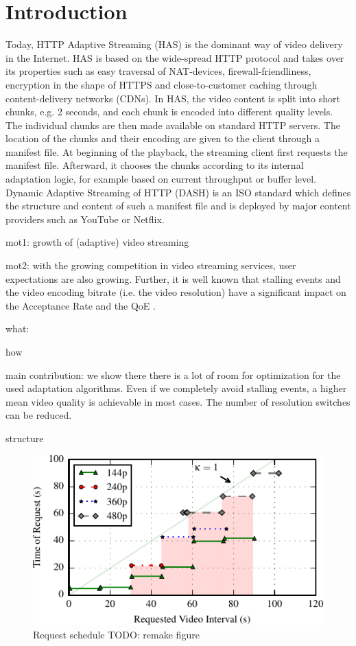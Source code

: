 
\section{Introduction}
\label{sec:introduction}

Today, HTTP Adaptive Streaming (HAS) is the dominant way of video delivery in the Internet. 
HAS is based on the wide-spread HTTP protocol and takes over its properties such as easy traversal of NAT-devices, firewall-friendliness, encryption in the shape of HTTPS and close-to-customer caching through content-delivery networks (CDNs).
In HAS, the video content is split into short chunks, e.g. 2 seconds, and each chunk is encoded into different quality levels.
The individual chunks are then made available on standard HTTP servers.
The location of the chunks and their encoding are given to the client through a manifest file.
At beginning of the playback, the streaming client first requests the manifest file. 
Afterward, it chooses the chunks according to its internal adaptation logic, for example based on current throughput or buffer level.
Dynamic Adaptive Streaming of HTTP (DASH) is an ISO standard which defines the structure and content of such a manifest file and is deployed by major content providers such as YouTube or Netflix.






mot1: growth of (adaptive) video streaming

mot2: with the growing competition in video streaming services, user expectations are also growing. Further, it is well known that stalling events and the video encoding bitrate (i.e. the video resolution) have a significant impact on the Acceptance Rate and the QoE \cite{casas2012youtube}.

what:

how

main contribution: we show there there is a lot of room for optimization for the used adaptation algorithms. Even if we completely avoid stalling events, a higher mean video quality is achievable in most cases. The number of resolution switches can be reduced.

structure


\begin{figure}[t]
\centering
\includegraphics[width=0.9\linewidth]{figs/eg_request_schedule}%
\caption{Request schedule TODO: remake figure}
\label{fig:request_schedule}%
\end{figure}

\cite{sieber16sacrificing,sieber15costaggressive}